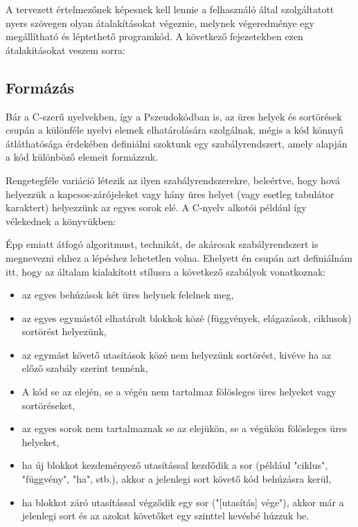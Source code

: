 A tervezett értelmezőnek képesnek kell lennie a felhasználó által szolgáltatott nyers szövegen olyan átalakításokat végeznie, melynek végeredménye egy megállítható és léptethető programkód. A következő fejezetekben ezen átalakításokat veszem sorra:

\subsection{Formázás}
\label{sec:formatting}

Bár a C-szerű nyelvekben, így a Pszeudokódban is, az üres helyek és sortörések csupán a különféle nyelvi elemek elhatárolására szolgálnak, mégis a kód könnyű átláthatósága érdekében definiálni szoktunk egy szabályrendszert, amely alapján a kód különböző elemeit formázzuk.

Rengetegféle variáció létezik az ilyen szabályrendszerekre, beleértve, hogy hová helyezzük a kapcsos-zárójeleket vagy hány üres helyet (vagy esetleg tabulátor karaktert) helyezzünk az egyes sorok elé. A C-nyelv alkotói például így vélekednek a könyvükben:

\cite{kr}

Épp emiatt átfogó algoritmust, technikát, de akárcsak szabályrendszert is megnevezni ehhez a lépéshez lehetetlen volna. Ehelyett én csupán azt definiálnám itt, hogy az általam kialakított stílusra a következő szabályok vonatkoznak:

\begin{itemize}
    \item az egyes behúzások két üres helynek felelnek meg,
    \item az egyes egymástól elhatárolt blokkok közé (függvények, elágazások, ciklusok) sortörést helyezünk,
    \item az egymást követő utasítások közé nem helyezünk sortörést, kivéve ha az előző szabály szerint tennénk,
    \item A kód se az elején, se a végén nem tartalmaz fölösleges üres helyeket vagy sortöréseket,
    \item az egyes sorok nem tartalmaznak se az elejükön, se a végükön fölösleges üres helyeket,
    \item ha új blokkot kezdeményező utasítással kezdődik a sor (például "ciklus", "függvény", "ha", stb.), akkor a jelenlegi sort követő kód behúzásra kerül,
    \item ha blokkot záró utasítással végződik egy sor ("[utasítás] vége"), akkor már a jelenlegi sort és az azokat követőket egy szinttel kevésbé húzzuk be.
\end{itemize}

